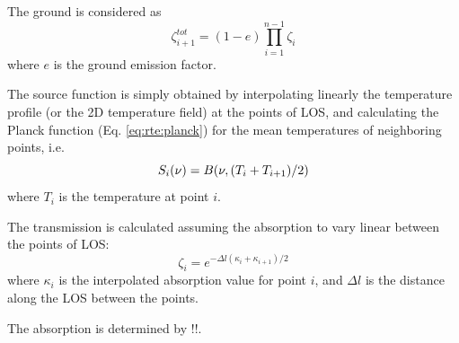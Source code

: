  The ground is considered as
 \begin{equation}
   \zeta_{i+1}^{tot} = (1-e)\prod_{i=1}^{n-1}\zeta_{i}
 \end{equation} 
 where $e$ is the ground emission factor.
 

 \label{sec:rte:calc}
   
 The source function is simply obtained by interpolating linearly the
 temperature profile (or the 2D temperature field) at the points of
 LOS, and calculating the Planck function (Eq. \ref{eq:rte:planck}) for
 the mean temperatures of neighboring points, i.e.
 \begin{equation}
   S_i(\nu) = B(\nu,(T_i+T_{i+1})/2)
  \label{eq:rte:planck2}
 \end{equation}
 where $T_i$ is the temperature at point $i$.
  
 The transmission is calculated assuming the absorption to vary
 linear between the points of LOS:
 \begin{equation}
   \zeta_i = e^{-\Delta l \left(\kappa_i+\kappa_{i+1}\right)/2 }
  \label{eq:rte:transm}
 \end{equation}
 where $\kappa_i$ is the interpolated absorption value for point $i$, and
 $\Delta l$ is the distance along the LOS between the points. 

 The absorption is determined by !!.


